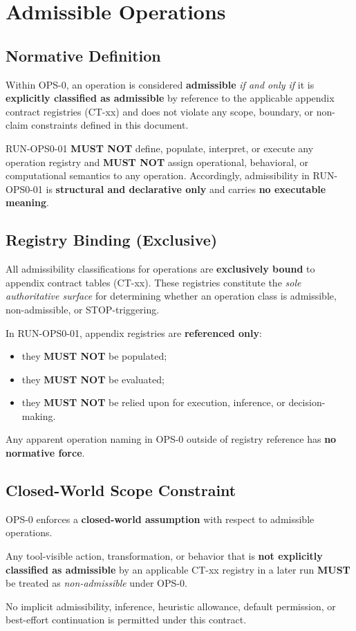 ﻿\section{Admissible Operations}

\subsection{Normative Definition}
Within OPS-0, an operation is considered \textbf{admissible} \emph{if and only if} it is
\textbf{explicitly classified as admissible} by reference to the applicable appendix contract registries (CT-xx)
and does not violate any scope, boundary, or non-claim constraints defined in this document.

RUN-OPS0-01 \textbf{MUST NOT} define, populate, interpret, or execute any operation registry and
\textbf{MUST NOT} assign operational, behavioral, or computational semantics to any operation.
Accordingly, admissibility in RUN-OPS0-01 is \textbf{structural and declarative only} and carries
\textbf{no executable meaning}.

\subsection{Registry Binding (Exclusive)}
All admissibility classifications for operations are \textbf{exclusively bound} to appendix contract tables (CT-xx).
These registries constitute the \emph{sole authoritative surface} for determining whether an operation class
is admissible, non-admissible, or STOP-triggering.

In RUN-OPS0-01, appendix registries are \textbf{referenced only}:
\begin{itemize}
  \item they \textbf{MUST NOT} be populated;
  \item they \textbf{MUST NOT} be evaluated;
  \item they \textbf{MUST NOT} be relied upon for execution, inference, or decision-making.
\end{itemize}

Any apparent operation naming in OPS-0 outside of registry reference has \textbf{no normative force}.

\subsection{Closed-World Scope Constraint}
OPS-0 enforces a \textbf{closed-world assumption} with respect to admissible operations.

Any tool-visible action, transformation, or behavior that is \textbf{not explicitly classified as admissible}
by an applicable CT-xx registry in a later run \textbf{MUST} be treated as \emph{non-admissible} under OPS-0.

No implicit admissibility, inference, heuristic allowance, default permission, or best-effort continuation
is permitted under this contract.
